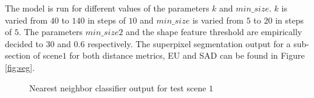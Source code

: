 \documentclass[12pt,twoside]{article}
\theoremstyle{plain}
\theoremstyle{definition}
\theoremstyle{remark}
\begin{document}
The model is run for different values of the parameters $k$ and $min\_size$. $k$ is varied from $40$ to $140$ in steps of $10$ and $min\_size$ is varied from $5$ to $20$ in steps of $5$. The parameters $min\_size2$ and the shape feature threshold are empirically decided to $30$ and $0.6$ respectively. The superpixel segmentation output for a sub-section of scene$1$ for both distance metrics, EU and SAD can be found in Figure \ref{fig:seg}.\\
\begin{figure}[htbp]
\label{fig:classify_nn_op}
\centering     %
{}
\caption{Nearest neighbor classifier output for test scene $1$}
\end{figure}
\end{document}

